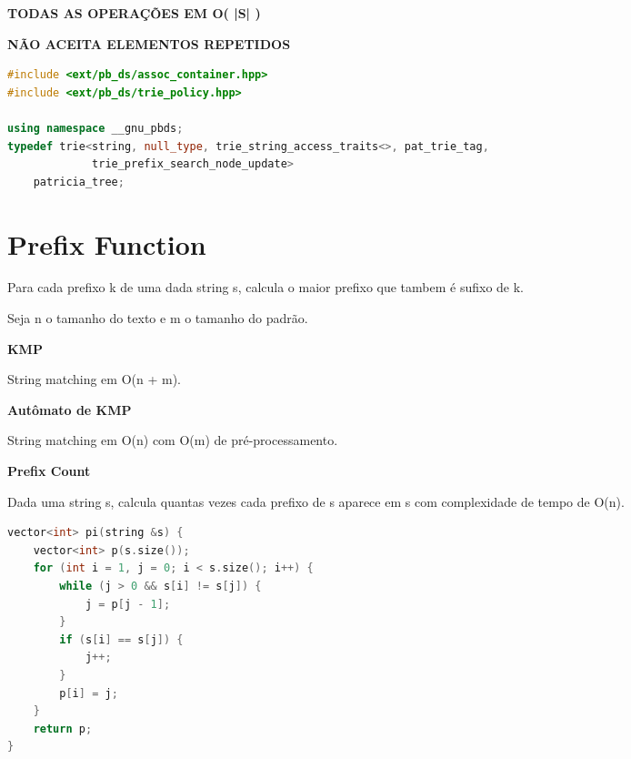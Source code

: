 \documentclass[11pt, a4paper, oneside]{book}
\begin{document}
\textbf{TODAS AS OPERAÇÕES EM O( |S| )}  

\textbf{NÃO ACEITA ELEMENTOS REPETIDOS}

\hfill

\begin{multicols}{2}
\begin{lstlisting}[language=C++]
#include <ext/pb_ds/assoc_container.hpp>
#include <ext/pb_ds/trie_policy.hpp>

using namespace __gnu_pbds;
typedef trie<string, null_type, trie_string_access_traits<>, pat_trie_tag,
             trie_prefix_search_node_update>
    patricia_tree;
\end{lstlisting}
\end{multicols}

\hfill

\section{Prefix Function}


Para cada prefixo k de uma dada string s, calcula o maior prefixo que tambem é sufixo de k.



Seja n o tamanho do texto e m o tamanho do padrão.



\textbf{KMP} 



String matching em O(n + m).



\textbf{Autômato de KMP} 



String matching em O(n) com O(m) de pré-processamento.



\textbf{Prefix Count} 



Dada uma string s, calcula quantas vezes cada prefixo de s aparece em s com complexidade de tempo de O(n).

\hfill

\begin{multicols}{2}
\begin{lstlisting}[language=C++]
vector<int> pi(string &s) {
    vector<int> p(s.size());
    for (int i = 1, j = 0; i < s.size(); i++) {
        while (j > 0 && s[i] != s[j]) {
            j = p[j - 1];
        }
        if (s[i] == s[j]) {
            j++;
        }
        p[i] = j;
    }
    return p;
}
\end{lstlisting}
\end{multicols}
\end{document}
